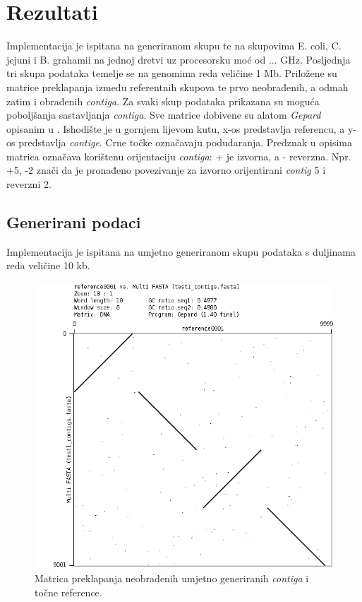 \documentclass[times, utf8, seminar, numeric]{fer}
\begin{document}
\chapter{Rezultati}
Implementacija je ispitana na generiranom skupu te na skupovima E. coli, C. jejuni i B. grahamii na jednoj dretvi uz procesorsku moć od ... GHz. Posljednja tri skupa podataka temelje se na genomima reda veličine 1 Mb. Priložene su matrice preklapanja između referentnih skupova te prvo neobrađenih, a odmah zatim i obrađenih \textit{contiga}. Za svaki skup podataka prikazana su moguća poboljšanja sastavljanja \textit{contiga}. Sve matrice dobivene su alatom \textit{Gepard} opisanim u \cite{gepard}. Ishodište je u gornjem lijevom kutu, x-os predstavlja referencu, a y-os predstavlja \textit{contige}. Crne točke označavaju podudaranja. Predznak u opisima matrica označava korištenu orijentaciju \textit{contiga}: + je izvorna, a - reverzna. Npr. +5, -2 znači da je pronađeno povezivanje za izvorno orijentirani \textit{contig} 5 i reverzni 2.

\section{Generirani podaci}
Implementacija je ispitana na umjetno generiranom skupu podataka s duljinama reda veličine 10 kb.

\begin{figure}[h]
	\centering
	\centerline{\includegraphics[width=0.7\linewidth]{img/generated}}
	\caption{Matrica preklapanja neobrađenih umjetno generiranih \textit{contiga} i točne reference.}
	\label{fig:generated}
\end{figure}
\end{document}
